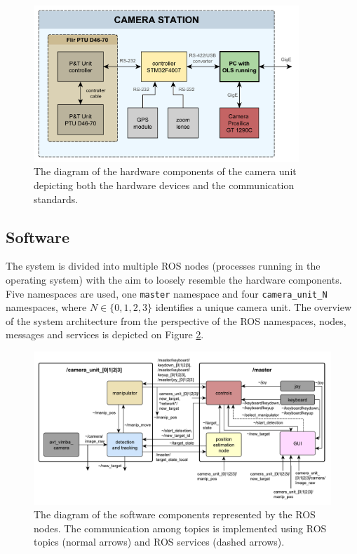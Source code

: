 \begin{figure}[htb]
	\centering
	\includegraphics[width=10cm]{fig/hw_camera_unit.pdf}
	\caption{The diagram of the hardware components of the camera unit depicting both the hardware devices and the communication standards.}
	\label{fig:hw_camera_unit}
\end{figure}



\subsection{Software}

The system is divided into multiple ROS nodes (processes running in the operating system) with the aim to loosely resemble the hardware components. Five namespaces are used, one \texttt{master} namespace and four \texttt{camera\_unit\_N} namespaces, where $N \in \{0, 1, 2, 3\}$ identifies a unique camera unit. The overview of the system architecture from the perspective of the ROS namespaces, nodes, messages and services is depicted on Figure \ref{fig:sw_ols}.

\begin{figure}[htb]
	\centering
	\includegraphics[width=15.5cm]{fig/sw_ols.pdf}
	\caption{The diagram of the software components represented by the ROS nodes. The communication among topics is implemented using ROS topics (normal arrows) and ROS services (dashed arrows).}
	\label{fig:sw_ols}
\end{figure}

